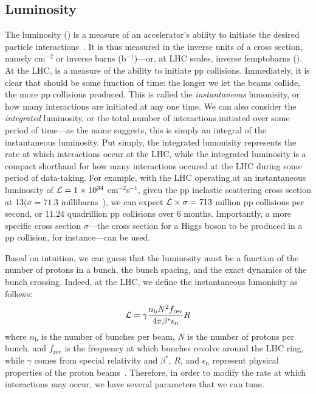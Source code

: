 \subsection{Luminosity}
The luminosity (\Lumi) is a measure of an accelerator's ability to initiate the desired particle interactions~\cite{Herr:941318}. 
It is thus measured in the inverse units of a cross section, namely cm$^{-2}$ or inverse barns (b$^{-1}$)---or, at LHC scales, inverse femptobarns (\fbinv).
At the LHC, \Lumi is a measure of the ability to initiate pp collisions. 
Immediately, it is clear that \Lumi should be some function of time: the longer we let the beams collide, the more pp collisions produced. 
This is called the \textit{instantaneous} lumonisity, or how many interactions are initiated at any one time. 
We can also consider the \textit{integrated} luminosity, or the total number of interactions initiated over some period of time---as the name suggests, this is simply an integral of the instantaneous luminosity. 
Put simply, the integrated lumonisity represents the rate at which interactions occur at the LHC, while the integrated luminosity is a compact shorthand for how many interactions occured at the LHC during some period of data-taking. 
For example, with the LHC operating at an instantaneous luminosity of $\mathcal{L} = 1\times10^{34}$ cm$^{-2}$s$^{-1}$, given the pp inelastic scattering cross section at 13\TeV ($\sigma = 71.3$ millibarns~\cite{CMS-PAS-FSQ-15-005}), we can expect $\mathcal{L}\times\sigma = 713$ million pp collisions per second, or 11.24 quadrillion pp collisions over 6 months. 
Importantly, a more specific cross section $\sigma$---the cross section for a Higgs boson to be produced in a pp collision, for instance---can be used. 

Based on intuition, we can guess that the luminosity must be a function of the number of protons in a bunch, the bunch spacing, and the exact dynamics of the bunch crossing. 
Indeed, at the LHC, we define the instantaneous lumonisity as follows:
\begin{equation}
    \mathcal{L} = \gamma\frac{n_\mathrm{b}N^2f_\text{rev}}{4\pi\beta^{*}\epsilon_\mathrm{n}}R
\end{equation}
where $n_\mathrm{b}$ is the number of bunches per beam, $N$ is the number of protons per bunch, and $f_\text{rev}$ is the frequency at which bunches revolve around the LHC ring, while $\gamma$ comes from special relativity and $\beta^{*}$, $R$, and $\epsilon_\mathrm{n}$ represent physical properties of the proton beams~\cite{Aberle:2749422}. 
Therefore, in order to modify the rate at which interactions may occur, we have several parameters that we can tune.

